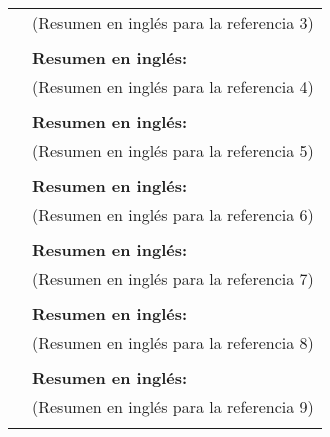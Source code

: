 \documentclass[10pt,letterpaper,final]{article}
\begin{document}
\begin{center}
\begin{tabularx}{\textwidth}{|X|}
            & (Resumen en inglés para la referencia 3) \\
            & \\
            \hline
            & \textbf{Resumen en inglés:} \\
            & (Resumen en inglés para la referencia 4) \\
            & \\
            \hline
            & \textbf{Resumen en inglés:} \\
            & (Resumen en inglés para la referencia 5) \\
            & \\
            \hline
            & \textbf{Resumen en inglés:} \\
            & (Resumen en inglés para la referencia 6) \\
            & \\
            \hline
            & \textbf{Resumen en inglés:} \\
            & (Resumen en inglés para la referencia 7) \\
            & \\
            \hline
            & \textbf{Resumen en inglés:} \\
            & (Resumen en inglés para la referencia 8) \\
            & \\
            \hline
            & \textbf{Resumen en inglés:} \\
            & (Resumen en inglés para la referencia 9) \\
            & \\
            \hline
        \end{tabularx}
    \end{center}~\nocite{*}
    
    
\end{document}
